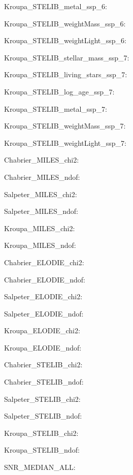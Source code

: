 \item Kroupa\_STELIB\_metal\_ssp\_6: 
\item Kroupa\_STELIB\_weightMass\_ssp\_6: 
\item Kroupa\_STELIB\_weightLight\_ssp\_6: 
\item Kroupa\_STELIB\_stellar\_mass\_ssp\_7: 
\item Kroupa\_STELIB\_living\_stars\_ssp\_7: 
\item Kroupa\_STELIB\_log\_age\_ssp\_7: 
\item Kroupa\_STELIB\_metal\_ssp\_7: 
\item Kroupa\_STELIB\_weightMass\_ssp\_7: 
\item Kroupa\_STELIB\_weightLight\_ssp\_7: 
\item Chabrier\_MILES\_chi2: 
\item Chabrier\_MILES\_ndof: 
\item Salpeter\_MILES\_chi2: 
\item Salpeter\_MILES\_ndof: 
\item Kroupa\_MILES\_chi2: 
\item Kroupa\_MILES\_ndof: 
\item Chabrier\_ELODIE\_chi2: 
\item Chabrier\_ELODIE\_ndof: 
\item Salpeter\_ELODIE\_chi2: 
\item Salpeter\_ELODIE\_ndof: 
\item Kroupa\_ELODIE\_chi2: 
\item Kroupa\_ELODIE\_ndof: 
\item Chabrier\_STELIB\_chi2: 
\item Chabrier\_STELIB\_ndof: 
\item Salpeter\_STELIB\_chi2: 
\item Salpeter\_STELIB\_ndof: 
\item Kroupa\_STELIB\_chi2: 
\item Kroupa\_STELIB\_ndof: 
\item SNR\_MEDIAN\_ALL: 
